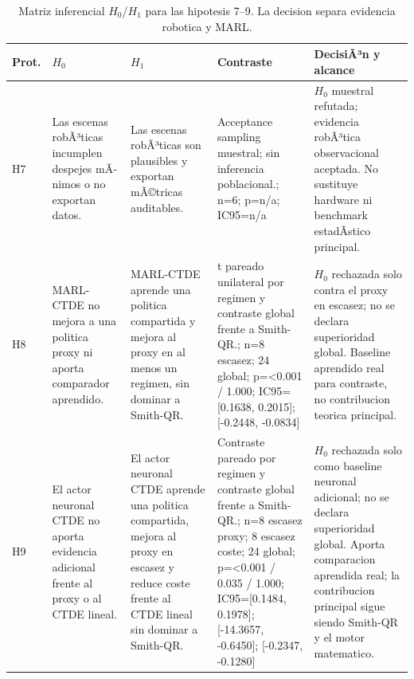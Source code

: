 \begin{table}[H]
\centering
\caption{Matriz inferencial $H_0$/$H_1$ para las hipotesis 7--9. La decision separa evidencia robotica y MARL.}
\label{tab:hypothesis-decision-base-c}
\scriptsize
\begin{tabularx}{\textwidth}{@{}>{\raggedright\arraybackslash}p{}>{\raggedright\arraybackslash}p{}>{\raggedright\arraybackslash}p{}>{\raggedright\arraybackslash}p{}>{\raggedright\arraybackslash}X@{}}
\toprule
Prot. & $H_0$ & $H_1$ & Contraste & DecisiÃ³n y alcance \\
\midrule
H7 & Las escenas robÃ³ticas incumplen despejes mÃ­nimos o no exportan datos. & Las escenas robÃ³ticas son plausibles y exportan mÃ©tricas auditables. & Acceptance sampling muestral; sin inferencia poblacional.; n=6; p=n/a; IC95=n/a & $H_0$ muestral refutada; evidencia robÃ³tica observacional aceptada. No sustituye hardware ni benchmark estadÃ­stico principal. \\
H8 & MARL-CTDE no mejora a una politica proxy ni aporta comparador aprendido. & MARL-CTDE aprende una politica compartida y mejora al proxy en al menos un regimen, sin dominar a Smith-QR. & t pareado unilateral por regimen y contraste global frente a Smith-QR.; n=8 escasez; 24 global; p=\textless{}0.001 / 1.000; IC95=[0.1638, 0.2015]; [-0.2448, -0.0834] & $H_0$ rechazada solo contra el proxy en escasez; no se declara superioridad global. Baseline aprendido real para contraste, no contribucion teorica principal. \\
H9 & El actor neuronal CTDE no aporta evidencia adicional frente al proxy o al CTDE lineal. & El actor neuronal CTDE aprende una politica compartida, mejora al proxy en escasez y reduce coste frente al CTDE lineal sin dominar a Smith-QR. & Contraste pareado por regimen y contraste global frente a Smith-QR.; n=8 escasez proxy; 8 escasez coste; 24 global; p=\textless{}0.001 / 0.035 / 1.000; IC95=[0.1484, 0.1978]; [-14.3657, -0.6450]; [-0.2347, -0.1280] & $H_0$ rechazada solo como baseline neuronal adicional; no se declara superioridad global. Aporta comparacion aprendida real; la contribucion principal sigue siendo Smith-QR y el motor matematico. \\
\bottomrule
\end{tabularx}
\end{table}

